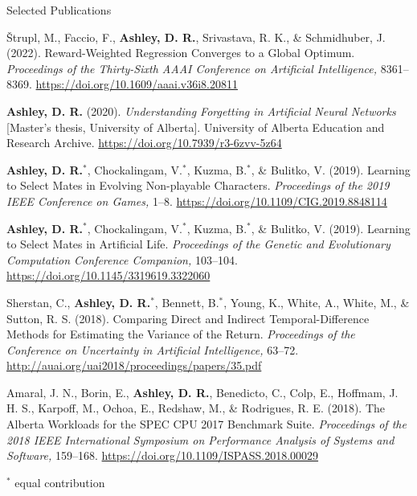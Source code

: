 \documentclass{cv}
\begin{document}
\begin{rSection}{Selected Publications}

\begin{rPublications}
    \item
        {\v{S}}trupl, M., Faccio, F., \textbf{Ashley, D. R.}, Srivastava, R. K., \& Schmidhuber, J.
        (2022).
        Reward-Weighted Regression Converges to a Global Optimum.
        \textit{Proceedings of the Thirty-Sixth AAAI Conference on Artificial Intelligence,} 8361--8369.
        \url{https://doi.org/10.1609/aaai.v36i8.20811}
    \item
        \textbf{Ashley, D. R.}
        (2020).
        \textit{Understanding Forgetting in Artificial Neural Networks} [Master's  thesis,  University  of  Alberta].
        University of Alberta Education and Research Archive.
        \url{https://doi.org/10.7939/r3-6zvv-5z64}
    \item
        \textbf{Ashley, D. R.}$^*$, Chockalingam, V.$^*$, Kuzma, B.$^*$, \& Bulitko, V.
        (2019).
        Learning to Select Mates in Evolving Non-playable Characters.
        \textit{Proceedings of the 2019 IEEE Conference on Games,} 1--8.
        \url{https://doi.org/10.1109/CIG.2019.8848114}
    \item
        \textbf{Ashley, D. R.}$^*$, Chockalingam, V.$^*$, Kuzma, B.$^*$, \& Bulitko, V.
        (2019).
        Learning to Select Mates in Artificial Life.
        \textit{Proceedings of the Genetic and Evolutionary Computation Conference Companion,} 103--104.
        \url{https://doi.org/10.1145/3319619.3322060}
    \item
        Sherstan, C., \textbf{Ashley, D. R.}$^*$, Bennett, B.$^*$, Young, K., White, A., White, M., \& Sutton, R. S.
        (2018).
        Comparing Direct and Indirect Temporal-Difference Methods for Estimating the Variance of the Return.
        \textit{Proceedings of the Conference on Uncertainty in Artificial Intelligence,} 63--72.
        \url{http://auai.org/uai2018/proceedings/papers/35.pdf}
    \item
        Amaral, J. N., Borin, E., \textbf{Ashley, D. R.}, Benedicto, C., Colp, E., Hoffmam, J. H. S., Karpoff, M., Ochoa, E., Redshaw, M., \& Rodrigues, R. E.
        (2018).
        The Alberta Workloads for the SPEC CPU 2017 Benchmark Suite.
        \textit{Proceedings of the 2018 IEEE International Symposium on Performance Analysis of Systems and Software,} 159--168.
        \url{https://doi.org/10.1109/ISPASS.2018.00029}
\end{rPublications}

\vspace{-0.3em} \hfill $^*$ \footnotesize{equal contribution} \vspace{-0.7em}

\end{rSection}
\end{document}

